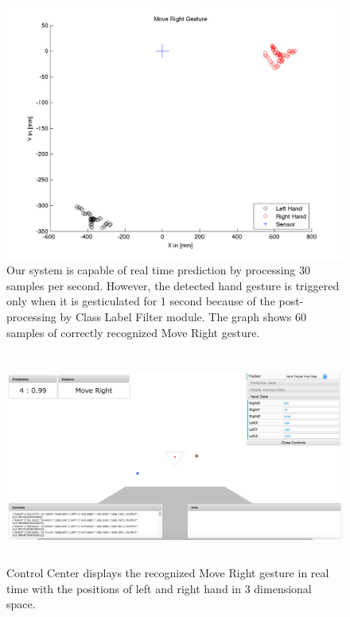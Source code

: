 \begin{figure}
	[h] \hspace{-15 mm} \centering 
	\includegraphics[width=155mm]{figures/result/test-move-right.jpg} \caption{Our system is capable of real time prediction by processing 30 samples per second. However, the detected hand gesture is triggered only when it is gesticulated for 1 second because of the post-processing by Class Label Filter module. The graph shows 60 samples of correctly recognized Move Right gesture. } \label{res:pl:move:right} 
\end{figure}
\begin{figure}
	[h] \centering 
	\includegraphics[height=70mm]{figures/result/cc-move-right.jpg} \caption{Control Center displays the recognized Move Right gesture in real time with the positions of left and right hand in 3 dimensional space.} \label{res:cc:move:right} 
\end{figure}
